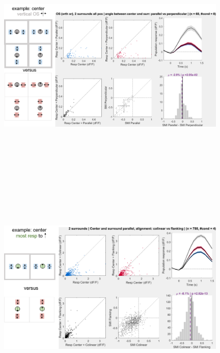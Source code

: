 \begin{figure}[H] \centering \includegraphics[width=11cm,height=11cm,keepaspectratio]{Figures/7.Results/population/sel/diagrams/10.png} 
\end{figure}

\begin{figure}[H] \centering \includegraphics[width=11cm,height=11cm,keepaspectratio]{Figures/7.Results/population/sel/diagrams/11.png} 
\end{figure}

